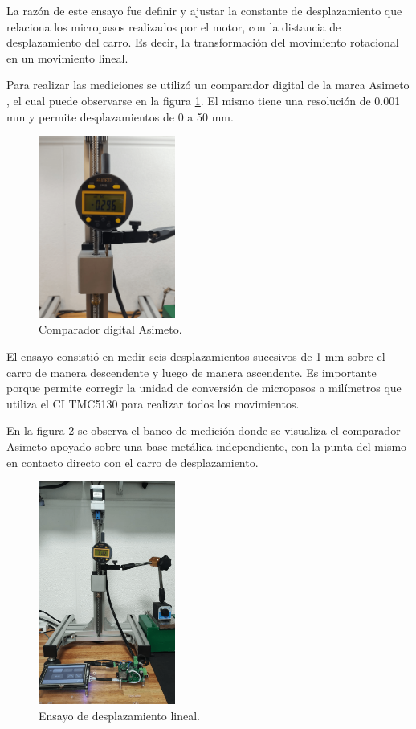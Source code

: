 La razón de este ensayo fue definir y ajustar la constante de desplazamiento que relaciona los micropasos realizados por el motor, con la distancia de desplazamiento del carro. Es decir, la transformación del movimiento rotacional en un movimiento lineal.

Para realizar las mediciones se utilizó un comparador digital de la marca Asimeto \citep{web_asimeto}, el cual puede observarse en la figura \ref{fig:micrometro}. El mismo tiene una resolución de 0.001 mm y permite desplazamientos de 0 a 50 mm.


\begin{figure}[h!]
\centering 
\includegraphics[width=0.4\textwidth]{./Figures/micrometro.png}
\caption{Comparador digital Asimeto.}
\label{fig:micrometro}
\end{figure}

El ensayo consistió en medir seis desplazamientos sucesivos de 1 mm sobre el carro de manera descendente y luego de manera ascendente. Es importante porque permite corregir la unidad de conversión de micropasos a milímetros que utiliza el CI TMC5130 para realizar todos los movimientos. 

En la figura \ref{fig:desplazamiento_lineal} se observa el banco de medición donde se visualiza el comparador Asimeto apoyado sobre una base metálica independiente, con la punta del mismo en contacto directo con el carro de desplazamiento.

\begin{figure}[h!]
\centering 
\includegraphics[width=0.4\textwidth]{./Figures/desplazamiento_lineal.png}
\caption{Ensayo de desplazamiento lineal.}
\label{fig:desplazamiento_lineal}
\end{figure}


